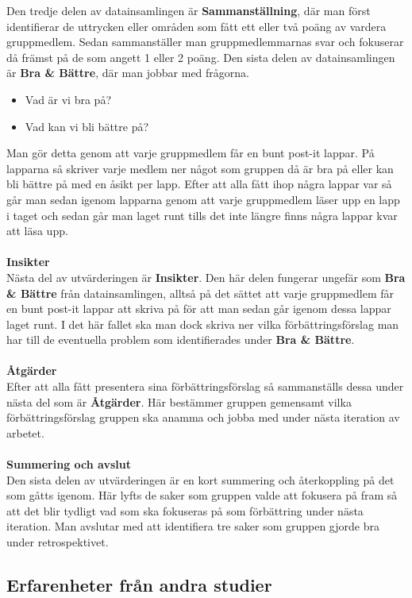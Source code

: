 Den tredje delen av datainsamlingen är \textbf{Sammanställning}, där man först identifierar de uttrycken eller områden som fått ett eller två poäng av vardera gruppmedlem. Sedan sammanställer man gruppmedlemmarnas svar och fokuserar då främst på de som angett 1 eller 2 poäng.
Den sista delen av datainsamlingen är \textbf{Bra \& Bättre}, där man jobbar med frågorna.
\begin{itemize}
\item Vad är vi bra på?
\item Vad kan vi bli bättre på?
\end{itemize}
Man gör detta genom att varje gruppmedlem får en bunt post-it lappar. På lapparna så skriver varje medlem ner något som gruppen då är bra på eller kan bli bättre på med en åsikt per lapp. Efter att alla fått ihop några lappar var så går man sedan igenom lapparna genom att varje gruppmedlem läser upp en lapp i taget och sedan går man laget runt tills det inte längre finns några lappar kvar att läsa upp.\\\\
\textbf{Insikter}\\
Nästa del av utvärderingen är \textbf{Insikter}. Den här delen fungerar ungefär som \textbf{Bra \& Bättre} från datainsamlingen, alltså på det sättet att varje gruppmedlem får en bunt post-it lappar att skriva på för att man sedan går igenom dessa lappar laget runt. I det här fallet ska man dock skriva ner vilka förbättringsförslag man har till de eventuella problem som identifierades under \textbf{Bra \& Bättre}.\\\\
\textbf{Åtgärder}\\
Efter att alla fått presentera sina förbättringsförslag så sammanställs dessa under nästa del som är \textbf{Åtgärder}. Här bestämmer gruppen gemensamt vilka förbättringsförslag gruppen ska anamma och jobba med under nästa iteration av arbetet.\\\\
\textbf{Summering och avslut}\\
Den sista delen av utvärderingen är en kort summering och återkoppling på det som gåtts igenom. Här lyfts de saker som gruppen valde att fokusera på fram så att det blir tydligt vad som ska fokuseras på som förbättring under nästa iteration.
Man avslutar med att identifiera tre saker som gruppen gjorde bra under retrospektivet.

\subsection{Erfarenheter från andra studier}

